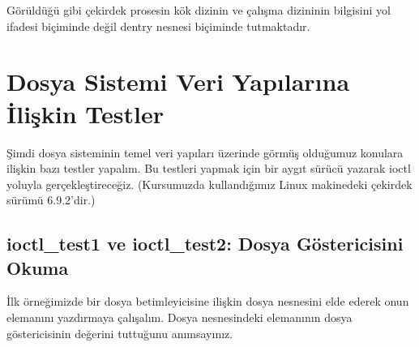 \documentclass[a4paper,10pt,turkish]{sphinxmanual}
\begin{document}
\begin{sphinxVerbatim}[commandchars=\\\{\}]





\end{sphinxVerbatim}

\sphinxAtStartPar
Görüldüğü gibi çekirdek prosesin kök dizinin ve çalışma dizininin bilgisini yol ifadesi biçiminde
değil dentry nesnesi biçiminde tutmaktadır.


\section{Dosya Sistemi Veri Yapılarına İlişkin Testler}
\label{\detokenize{filesystem1:dosya-sistemi-veri-yapilarina-iliskin-testler}}
\sphinxAtStartPar
Şimdi dosya sisteminin temel veri yapıları üzerinde görmüş olduğumuz konulara ilişkin bazı
testler yapalım. Bu testleri yapmak için bir aygıt sürücü yazarak ioctl yoluyla gerçekleştireceğiz.
(Kursumuzda kullandığımız Linux makinedeki çekirdek sürümü 6.9.2’dir.)


\subsection{ioctl\_test1 ve ioctl\_test2: Dosya Göstericisini Okuma}
\label{\detokenize{filesystem1:ioctl-test1-ve-ioctl-test2-dosya-gostericisini-okuma}}
\sphinxAtStartPar
İlk örneğimizde bir dosya betimleyicisine ilişkin dosya nesnesini elde ederek onun 
elemanını yazdırmaya çalışalım. Dosya nesnesindeki  elemanının dosya göstericisinin
değerini tuttuğunu anımsayınız.
\end{document}

